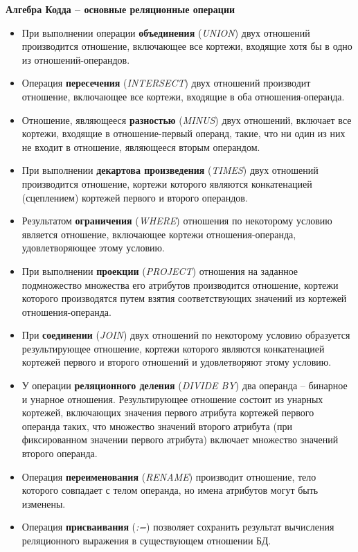 \textbf{Алгебра Кодда -- основные реляционные операции}
\begin{itemize}
    \item При выполнении операции \textbf{объединения} (\textit{UNION}) двух отношений производится отношение, включающее все кортежи, входящие хотя бы в одно из отношений-операндов.
    \item Операция \textbf{пересечения} (\textit{INTERSECT}) двух отношений производит отношение, включающее все кортежи, входящие в оба отношения-операнда.
    \item Отношение, являющееся \textbf{разностью} (\textit{MINUS}) двух отношений, включает все кортежи, входящие в отношение-первый операнд, такие, что ни один из них не входит в отношение, являющееся вторым операндом.
    \item При выполнении \textbf{декартова произведения} (\textit{TIMES}) двух отношений производится отношение, кортежи которого являются конкатенацией (сцеплением) кортежей первого и второго операндов.
    \item Результатом \textbf{ограничения} (\textit{WHERE}) отношения по некоторому условию является отношение, включающее кортежи отношения-операнда, удовлетворяющее этому условию.
    \item При выполнении \textbf{проекции} (\textit{PROJECT}) отношения на заданное подмножество множества его атрибутов производится отношение, кортежи которого производятся путем взятия соответствующих значений из кортежей отношения-операнда.
    \item При \textbf{соединении} (\textit{JOIN}) двух отношений по некоторому условию образуется результирующее отношение, кортежи которого являются конкатенацией кортежей первого и второго отношений и удовлетворяют этому условию.
    \item У операции \textbf{реляционного деления} (\textit{DIVIDE BY}) два операнда – бинарное и унарное отношения. Результирующее отношение состоит из унарных кортежей, включающих значения первого атрибута кортежей первого операнда таких, что множество значений второго атрибута (при фиксированном значении первого атрибута) включает множество значений второго операнда.
    \item Операция \textbf{переименования} (\textit{RENAME}) производит отношение, тело которого совпадает с телом операнда, но имена атрибутов могут быть изменены.
    \item Операция \textbf{присваивания} (\textit{:=}) позволяет сохранить результат вычисления реляционного выражения в существующем отношении БД.
\end{itemize}

